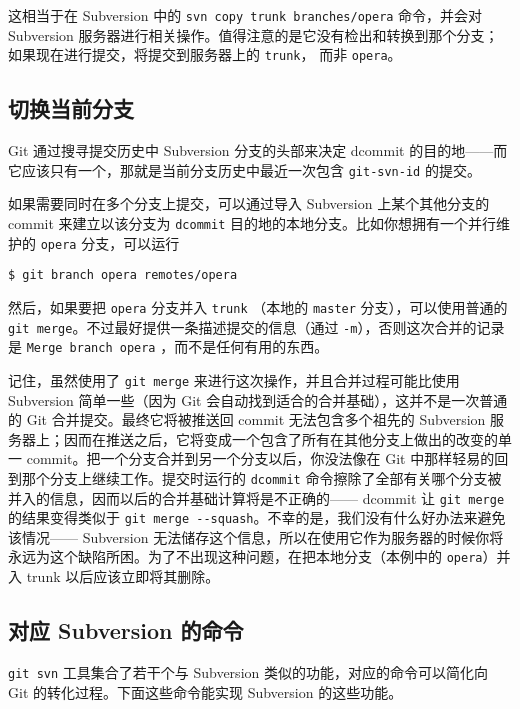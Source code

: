 \documentclass[a4paper]{book}
\begin{document}
这相当于在 Subversion 中的 \texttt{svn copy trunk branches/opera} 命令，并会对 Subversion 服务器进行相关操作。值得注意的是它没有检出和转换到那个分支；如果现在进行提交，将提交到服务器上的 \texttt{trunk}， 而非 \texttt{opera}。

\subsection{切换当前分支}

Git 通过搜寻提交历史中 Subversion 分支的头部来决定 dcommit 的目的地------而它应该只有一个，那就是当前分支历史中最近一次包含 \texttt{git-svn-id} 的提交。

如果需要同时在多个分支上提交，可以通过导入 Subversion 上某个其他分支的 commit 来建立以该分支为 \texttt{dcommit} 目的地的本地分支。比如你想拥有一个并行维护的 \texttt{opera} 分支，可以运行

\begin{shaded}\begin{verbatim}
$ git branch opera remotes/opera
\end{verbatim}\end{shaded}

然后，如果要把 \texttt{opera} 分支并入 \texttt{trunk} （本地的 \texttt{master} 分支），可以使用普通的 \texttt{git merge}。不过最好提供一条描述提交的信息（通过 \texttt{-m}），否则这次合并的记录是 \texttt{Merge branch opera} ，而不是任何有用的东西。

记住，虽然使用了 \texttt{git merge} 来进行这次操作，并且合并过程可能比使用 Subversion 简单一些（因为 Git 会自动找到适合的合并基础），这并不是一次普通的 Git 合并提交。最终它将被推送回 commit 无法包含多个祖先的 Subversion 服务器上；因而在推送之后，它将变成一个包含了所有在其他分支上做出的改变的单一 commit。把一个分支合并到另一个分支以后，你没法像在 Git 中那样轻易的回到那个分支上继续工作。提交时运行的 \texttt{dcommit} 命令擦除了全部有关哪个分支被并入的信息，因而以后的合并基础计算将是不正确的------ dcommit 让 \texttt{git merge} 的结果变得类似于 \texttt{git merge -{}-squash}。不幸的是，我们没有什么好办法来避免该情况------ Subversion 无法储存这个信息，所以在使用它作为服务器的时候你将永远为这个缺陷所困。为了不出现这种问题，在把本地分支（本例中的 \texttt{opera}）并入 trunk 以后应该立即将其删除。

\subsection{对应 Subversion 的命令}

\texttt{git svn} 工具集合了若干个与 Subversion 类似的功能，对应的命令可以简化向 Git 的转化过程。下面这些命令能实现 Subversion 的这些功能。
\end{document}
